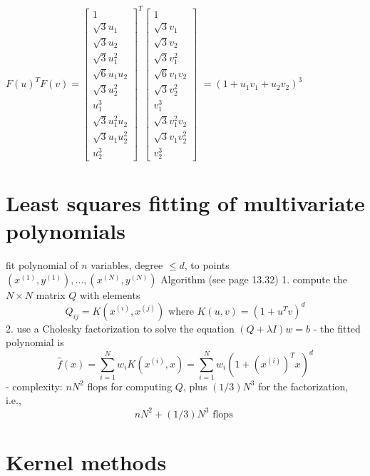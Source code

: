 $ F(u)^{T} F(v)=\left[\begin{array}{c}1 \\ \sqrt{3} u_{1} \\ \sqrt{3} u_{2} \\ \sqrt{3} u_{1}^{2} \\ \sqrt{6} u_{1} u_{2} \\ \sqrt{3} u_{2}^{2} \\ u_{1}^{3} \\ \sqrt{3} u_{1}^{2} u_{2} \\ \sqrt{3} u_{1} u_{2}^{2} \\ u_{2}^{3}\end{array}\right]^{T}\left[\begin{array}{c}1 \\ \sqrt{3} v_{1} \\ \sqrt{3} v_{2} \\ \sqrt{3} v_{1}^{2} \\ \sqrt{6} v_{1} v_{2} \\ \sqrt{3} v_{2}^{2} \\ v_{1}^{3} \\ \sqrt{3} v_{1}^{2} v_{2} \\ \sqrt{3} v_{1} v_{2}^{2} \\ v_{2}^{3}\end{array}\right] $
$ =\left(1+u_{1} v_{1}+u_{2} v_{2}\right)^{3} $

\section{Least squares fitting of multivariate polynomials}

fit polynomial of $ n $ variables, degree $ \leq d $, to points $ \left(x^{(1)}, y^{(1)}\right), \ldots,\left(x^{(N)}, y^{(N)}\right) $ Algorithm (see page 13.32)
1. compute the $ N \times N $ matrix $ Q $ with elements
$$
Q_{i j}=K\left(x^{(i)}, x^{(j)}\right) \text { where } K(u, v)=\left(1+u^{T} v\right)^{d}
$$
2. use a Cholesky factorization to solve the equation $ (Q+\lambda I) w=b $
- the fitted polynomial is
$$
\hat{f}(x)=\sum_{i=1}^{N} w_{i} K\left(x^{(i)}, x\right)=\sum_{i=1}^{N} w_{i}\left(1+\left(x^{(i)}\right)^{T} x\right)^{d}
$$
- complexity: $ n N^{2} $ flops for computing $ Q $, plus $ (1 / 3) N^{3} $ for the factorization, i.e.,
$$
n N^{2}+(1 / 3) N^{3} \text { flops }
$$

\section{Kernel methods}

